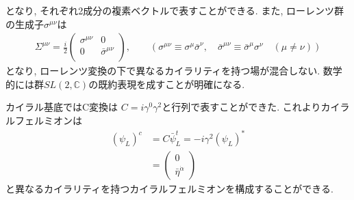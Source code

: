 となり, それぞれ2成分の複素ベクトルで表すことができる.
また, ローレンツ群の生成子$\sigma^{\mu\nu}$は
\begin{align}
  \Sigma ^{\mu\nu} = \frac{i}{2}\left(\begin{array}{cc}
      \sigma ^{\mu\nu} & 0 \\
                             0                & \bar{\sigma}^{\mu\nu} \\
                           \end{array}
                         \right),\qquad(\sigma^{\mu\nu}\equiv \sigma^\mu\bar{\sigma}^\nu,\quad\bar{\sigma}^{\mu\nu}\equiv\bar{\sigma}^\mu\sigma^\nu\quad(\mu\neq\nu))
\end{align}
となり, ローレンツ変換の下で異なるカイラリティを持つ場が混合しない.
数学的には群$SL(2,\mathbb{C})$の既約表現を成すことが明確になる.

カイラル基底ではC変換は $C = i\gamma^0\gamma^2$と行列で表すことができた.
これよりカイラルフェルミオンは
\begin{align}
  (\psi_L)^c &= C\bar{\psi}_L^t = -i\gamma^2 (\psi_L)^*\nonumber\\
             &= \left(\begin{array}{c}
                        0 \\
                        \bar{\eta}^{\dot{\alpha}}
                      \end{array}\right)
\end{align}
と異なるカイラリティを持つカイラルフェルミオンを構成することができる.

